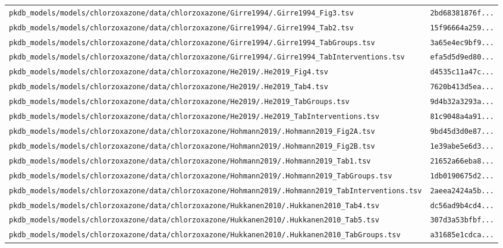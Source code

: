 \begin{longtable}{ll}
\texttt{pkdb\_models/models/chlorzoxazone/data/chlorzoxazone/Girre1994/.Girre1994\_Fig3.tsv} & \texttt{2bd68381876f...} \\
\texttt{pkdb\_models/models/chlorzoxazone/data/chlorzoxazone/Girre1994/.Girre1994\_Tab2.tsv} & \texttt{15f96664a259...} \\
\texttt{pkdb\_models/models/chlorzoxazone/data/chlorzoxazone/Girre1994/.Girre1994\_TabGroups.tsv} & \texttt{3a65e4ec9bf9...} \\
\texttt{pkdb\_models/models/chlorzoxazone/data/chlorzoxazone/Girre1994/.Girre1994\_TabInterventions.tsv} & \texttt{efa5d5d9ed80...} \\
\texttt{pkdb\_models/models/chlorzoxazone/data/chlorzoxazone/He2019/.He2019\_Fig4.tsv} & \texttt{d4535c11a47c...} \\
\texttt{pkdb\_models/models/chlorzoxazone/data/chlorzoxazone/He2019/.He2019\_Tab4.tsv} & \texttt{7620b413d5ea...} \\
\texttt{pkdb\_models/models/chlorzoxazone/data/chlorzoxazone/He2019/.He2019\_TabGroups.tsv} & \texttt{9d4b32a3293a...} \\
\texttt{pkdb\_models/models/chlorzoxazone/data/chlorzoxazone/He2019/.He2019\_TabInterventions.tsv} & \texttt{81c9048a4a91...} \\
\texttt{pkdb\_models/models/chlorzoxazone/data/chlorzoxazone/Hohmann2019/.Hohmann2019\_Fig2A.tsv} & \texttt{9bd45d3d0e87...} \\
\texttt{pkdb\_models/models/chlorzoxazone/data/chlorzoxazone/Hohmann2019/.Hohmann2019\_Fig2B.tsv} & \texttt{1e39abe5e6d3...} \\
\texttt{pkdb\_models/models/chlorzoxazone/data/chlorzoxazone/Hohmann2019/.Hohmann2019\_Tab1.tsv} & \texttt{21652a66eba8...} \\
\texttt{pkdb\_models/models/chlorzoxazone/data/chlorzoxazone/Hohmann2019/.Hohmann2019\_TabGroups.tsv} & \texttt{1db0190675d2...} \\
\texttt{pkdb\_models/models/chlorzoxazone/data/chlorzoxazone/Hohmann2019/.Hohmann2019\_TabInterventions.tsv} & \texttt{2aeea2424a5b...} \\
\texttt{pkdb\_models/models/chlorzoxazone/data/chlorzoxazone/Hukkanen2010/.Hukkanen2010\_Tab4.tsv} & \texttt{dc56ad9b4cd4...} \\
\texttt{pkdb\_models/models/chlorzoxazone/data/chlorzoxazone/Hukkanen2010/.Hukkanen2010\_Tab5.tsv} & \texttt{307d3a53bfbf...} \\
\texttt{pkdb\_models/models/chlorzoxazone/data/chlorzoxazone/Hukkanen2010/.Hukkanen2010\_TabGroups.tsv} & \texttt{a31685e1cdca...} \\

\end{longtable}
